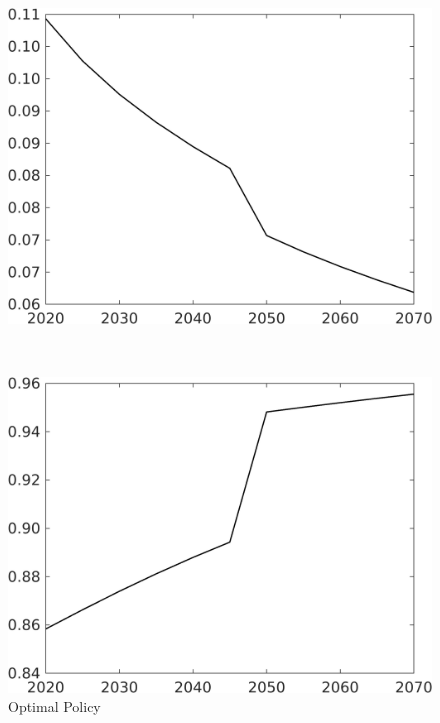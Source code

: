\begin{figure}[h!!]
	\centering
	\caption{Optimal Policy }\label{fig:optPol}
	\begin{minipage}[]{0.4\textwidth}
		\includegraphics[width=1\textwidth]{../../codding_model/own_basedOnFried/optimalPol_190722_tidiedUp/figures/all_10Aout22/Single_OPT_T_NoTaus_taul_regime3_spillover0_noskill0_sep1_xgrowth0_extern0_etaa0.79.png}
	\end{minipage}
	\begin{minipage}[]{0.1\textwidth}
		\
	\end{minipage}
	\begin{minipage}[]{0.4\textwidth}
		\includegraphics[width=1\textwidth]{../../codding_model/own_basedOnFried/optimalPol_190722_tidiedUp/figures/all_10Aout22/Single_OPT_T_NoTaus_tauf_regime3_spillover0_noskill0_sep1_xgrowth0_extern0_etaa0.79.png}
	\end{minipage}
\end{figure} 

